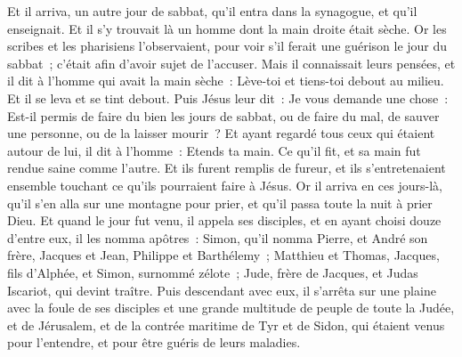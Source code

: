 \begin{multicols}{2}
Et il arriva, un autre jour de sabbat, qu'il entra dans la synagogue, et qu'il enseignait. Et il s'y trouvait là un homme dont la main droite était sèche.
Or les scribes et les pharisiens l'observaient, pour voir s'il ferait une guérison le jour du sabbat~; c'était afin d'avoir sujet de l'accuser.
Mais il connaissait leurs pensées, et il dit à l'homme qui avait la main sèche~: Lève-toi et tiens-toi debout au milieu. Et il se leva et se tint debout.
Puis Jésus leur dit~: Je vous demande une chose~: Est-il permis de faire du bien les jours de sabbat, ou de faire du mal, de sauver une personne, ou de la laisser mourir~?
Et ayant regardé tous ceux qui étaient autour de lui, il dit à l'homme~: Etends ta main. Ce qu'il fit, et sa main fut rendue saine comme l'autre.
Et ils furent remplis de fureur, et ils s'entretenaient ensemble touchant ce qu'ils pourraient faire à Jésus.
Or il arriva en ces jours-là, qu'il s'en alla sur une montagne pour prier, et qu'il passa toute la nuit à prier Dieu.
Et quand le jour fut venu, il appela ses disciples, et en ayant choisi douze d'entre eux, il les nomma apôtres~:
Simon, qu'il nomma Pierre, et André son frère, Jacques et Jean, Philippe et Barthélemy~;
Matthieu et Thomas, Jacques, fils d'Alphée, et Simon, surnommé zélote~;
Jude, frère de Jacques, et Judas Iscariot, qui devint traître.
Puis descendant avec eux, il s'arrêta sur une plaine avec la foule de ses disciples et une grande multitude de peuple de toute la Judée, et de Jérusalem, et de la contrée maritime de Tyr et de Sidon, qui étaient venus pour l'entendre, et pour être guéris de leurs maladies.

\end{multicols}
